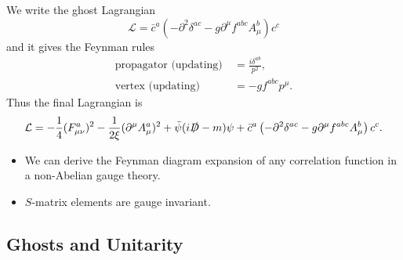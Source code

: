 \documentclass[a4paper,pdftex]{article}
\begin{document}
We write the ghost Lagrangian
\begin{equation}
  \mathcal{L}
  =
  \bar{c}^{a}
  \left(  
    -
    \partial^2 \delta^{ac}
    -
    g\partial^{\mu}f^{abc}A_{\mu}^{b}
  \right)
  c^{c}
\end{equation}
and it gives the Feynman rules
\begin{align}
  \text{propagator\ (updating)}\ 
  &=
  \frac{i\delta^{ab}}{p^2}
  ,
  \\
  \text{vertex\ (updating)}\ 
  &=
  -gf^{abc}p^{\mu}
  .
\end{align}
Thus the final Lagrangian is 
\begin{equation}
  \mathcal{L}
  =
  -
  \frac{1}{4}
  (F_{\mu\nu}^{a})^2
  -
  \frac{1}{2\xi}(\partial^{\mu}A_{\mu}^{a})^2
  +
  \bar{\psi}(i\slashed{D}-m)\psi
  +
  \bar{c}^{a}
  \left(  
    -
    \partial^2 \delta^{ac}
    -
    g\partial^{\mu}f^{abc}A_{\mu}^{b}
  \right)
  c^{c}
  .  
\end{equation}

\begin{itemize}
  \item 
  We can derive the Feynman diagram expansion of any correlation function in a non-Abelian gauge theory.
  \item 
  $S$-matrix elements are gauge invariant.
\end{itemize}


\subsection{Ghosts and Unitarity}
\end{document}
